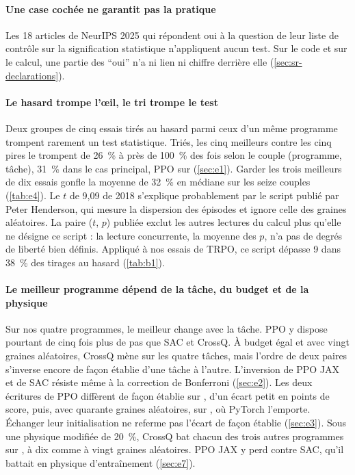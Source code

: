 \paragraph{Une case cochée ne garantit pas la pratique} Les 18 articles de NeurIPS 2025 qui répondent oui à la
question de leur liste de contrôle sur la signification statistique n'appliquent aucun test. Sur le
code et sur le calcul, une partie des \enquote{oui} n'a ni lien ni chiffre derrière elle
(\cref{sec:sr-declarations}).

\paragraph{Le hasard trompe l'œil, le tri trompe le test} Deux groupes de cinq essais tirés au hasard
parmi ceux d'un même programme trompent rarement un test statistique. Triés, les cinq meilleurs
contre les cinq pires le trompent de 26~\% à près de 100~\% des fois selon le couple (programme,
tâche), 31~\% dans le cas principal, PPO sur  (\cref{sec:e1}). Garder les trois
meilleurs de dix essais gonfle la moyenne de 32~\% en médiane sur les seize couples
(\cref{tab:e4}). Le $t$ de 9,09 de 2018 s'explique probablement par le script publié par Peter
Henderson, qui mesure la dispersion des épisodes et ignore celle des graines aléatoires. La paire
($t$, $p$) publiée exclut les autres lectures du calcul plus qu'elle ne désigne ce script : la
lecture concurrente, la moyenne des $p$, n'a pas de degrés de liberté bien définis. Appliqué à nos
essais de TRPO, ce script dépasse 9 dans 38~\% des tirages au hasard (\cref{tab:b1}).

\paragraph{Le meilleur programme dépend de la tâche, du budget et de la physique} Sur nos quatre programmes, le meilleur change avec la tâche.
PPO y dispose pourtant de cinq fois plus de pas que SAC et CrossQ. À budget égal et avec vingt
graines aléatoires, CrossQ mène sur les quatre tâches, mais l'ordre de deux paires s'inverse encore
de façon établie d'une tâche à l'autre. L'inversion de PPO JAX et de SAC résiste même à la correction de Bonferroni (\cref{sec:e2}).
Les deux écritures de PPO diffèrent de façon établie sur , d'un écart petit en
points de score, puis, avec quarante graines aléatoires, sur , où PyTorch l'emporte. Échanger
leur initialisation ne referme pas l'écart de façon établie (\cref{sec:e3}). Sous une physique modifiée de 20~\%, CrossQ bat chacun des trois
autres programmes sur , à dix comme à vingt graines aléatoires. PPO JAX y perd contre SAC, qu'il battait en physique d'entraînement (\cref{sec:e7}).

